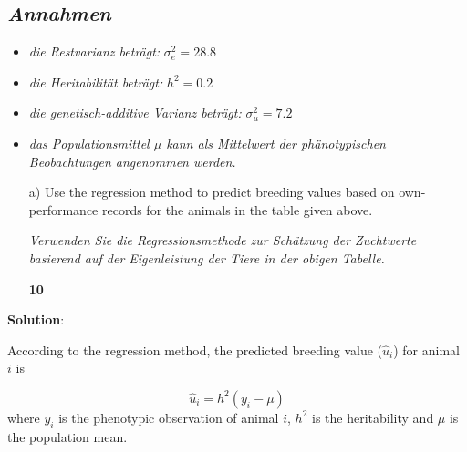 \documentclass[
]{article}
\newenvironment{Shaded}{\begin{snugshade}}{\end{snugshade}}
\newcommand{\DataTypeTok}[1]{\textcolor[rgb]{0.13,0.29,0.53}{#1}}
\newcommand{\KeywordTok}[1]{\textcolor[rgb]{0.13,0.29,0.53}{\textbf{#1}}}
\newcommand{\NormalTok}[1]{#1}
\newcommand{\OperatorTok}[1]{\textcolor[rgb]{0.81,0.36,0.00}{\textbf{#1}}}
\newcommand{\StringTok}[1]{\textcolor[rgb]{0.31,0.60,0.02}{#1}}
\providecommand{\tightlist}{%
  \setlength{\itemsep}{0pt}\setlength{\parskip}{0pt}}
\newcommand{\points}[1]
{\begin{flushright}\textbf{#1}\end{flushright}}
\newcommand{\solstart}
{\vspace{3ex}\textbf{Solution}:}
\begin{document}
\hypertarget{section}{%
\subsection{\texorpdfstring{\textit{Annahmen}}{}}\label{section}}

\begin{itemize}
\tightlist
\item
  \textit{die Restvarianz beträgt:} \(\sigma_e^2 = 28.8\)
\item
  \textit{die Heritabilität beträgt:} \(h^2 = 0.2\)
\item
  \textit{die genetisch-additive Varianz beträgt:} \(\sigma_u^2 = 7.2\)
\item
  \textit{das Populationsmittel $\mu$ kann als Mittelwert der phänotypischen Beobachtungen angenommen werden.}
\end{itemize}

\vspace{3ex}
\begin{enumerate}
\item[a)] Use the regression method to predict breeding values based on own-performance records for the animals in the table given above.

\textit{Verwenden Sie die Regressionsmethode zur Schätzung der Zuchtwerte basierend auf der Eigenleistung der Tiere in der obigen Tabelle.}
\points{10}
\end{enumerate}

\clearpage
\pagebreak

\solstart

According to the regression method, the predicted breeding value
(\(\hat{u}_i\)) for animal \(i\) is

\[\hat{u}_i = h^2(y_i - \mu)\] where \(y_i\) is the phenotypic
observation of animal \(i\), \(h^2\) is the heritability and \(\mu\) is
the population mean.

\vspace{3ex}

\begin{Shaded}
\end{Shaded}
\end{document}
